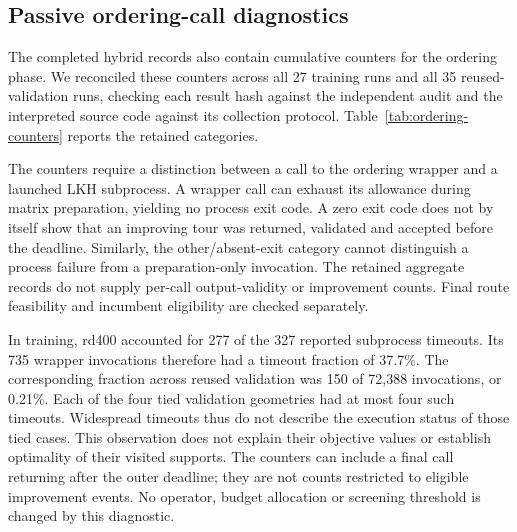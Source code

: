 \subsection{Passive ordering-call diagnostics}
The completed hybrid records also contain cumulative counters for the
ordering phase. We reconciled these counters across all 27 training runs
and all 35 reused-validation runs, checking each result hash against the
independent audit and the interpreted source code against its collection
protocol. Table~\ref{tab:ordering-counters} reports the retained categories.



The counters require a distinction between a call to the ordering wrapper
and a launched LKH subprocess. A wrapper call can exhaust its allowance
during matrix preparation, yielding no process exit code. A zero exit code
does not by itself show that an improving tour was returned, validated and
accepted before the deadline. Similarly, the other/absent-exit category
cannot distinguish a process failure from a preparation-only invocation.
The retained aggregate records do not supply per-call output-validity or
improvement counts. Final route feasibility and incumbent eligibility are
checked separately.

In training, rd400 accounted for 277 of the 327 reported subprocess timeouts.
Its 735 wrapper invocations therefore had a timeout fraction of 37.7\%.
The corresponding fraction across reused validation was 150 of 72,388
invocations, or 0.21\%. Each of the four tied validation geometries had at
most four such timeouts. Widespread timeouts thus do not describe the
execution status of those tied cases. This observation does not explain
their objective values or establish optimality of their visited supports.
The counters can include a final call returning after the outer deadline;
they are not counts restricted to eligible improvement events. No operator,
budget allocation or screening threshold is changed by this diagnostic.
